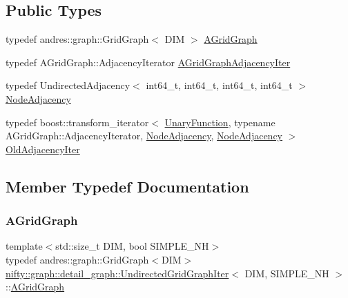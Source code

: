 \subsection*{Public Types}
\begin{DoxyCompactItemize}
\item 
typedef andres\+::graph\+::\+Grid\+Graph$<$ D\+IM $>$ \hyperlink{classnifty_1_1graph_1_1detail__graph_1_1UndirectedGridGraphIter_a562bd40c2ea973c15b828062247ddd1f}{A\+Grid\+Graph}
\item 
typedef A\+Grid\+Graph\+::\+Adjacency\+Iterator \hyperlink{classnifty_1_1graph_1_1detail__graph_1_1UndirectedGridGraphIter_a824924927d819949af2370aa628af595}{A\+Grid\+Graph\+Adjacency\+Iter}
\item 
typedef Undirected\+Adjacency$<$ int64\+\_\+t, int64\+\_\+t, int64\+\_\+t, int64\+\_\+t $>$ \hyperlink{classnifty_1_1graph_1_1detail__graph_1_1UndirectedGridGraphIter_ab102d464df39aae71f7482baa37d8966}{Node\+Adjacency}
\item 
typedef boost\+::transform\+\_\+iterator$<$ \hyperlink{structnifty_1_1graph_1_1detail__graph_1_1UndirectedGridGraphIter_1_1UnaryFunction}{Unary\+Function}, typename A\+Grid\+Graph\+::\+Adjacency\+Iterator, \hyperlink{classnifty_1_1graph_1_1detail__graph_1_1UndirectedGridGraphIter_ab102d464df39aae71f7482baa37d8966}{Node\+Adjacency}, \hyperlink{classnifty_1_1graph_1_1detail__graph_1_1UndirectedGridGraphIter_ab102d464df39aae71f7482baa37d8966}{Node\+Adjacency} $>$ \hyperlink{classnifty_1_1graph_1_1detail__graph_1_1UndirectedGridGraphIter_a0b2569d896d215175b54ed1f439ad5a5}{Old\+Adjacency\+Iter}
\end{DoxyCompactItemize}


\subsection{Member Typedef Documentation}
\mbox{\label{classnifty_1_1graph_1_1detail__graph_1_1UndirectedGridGraphIter_a562bd40c2ea973c15b828062247ddd1f}} 
\subsubsection{\texorpdfstring{A\+Grid\+Graph}{AGridGraph}}
{\footnotesize\ttfamily template$<$std\+::size\+\_\+t D\+IM, bool S\+I\+M\+P\+L\+E\+\_\+\+NH$>$ \\
typedef andres\+::graph\+::\+Grid\+Graph$<$D\+IM$>$ \hyperlink{classnifty_1_1graph_1_1detail__graph_1_1UndirectedGridGraphIter}{nifty\+::graph\+::detail\+\_\+graph\+::\+Undirected\+Grid\+Graph\+Iter}$<$ D\+IM, S\+I\+M\+P\+L\+E\+\_\+\+NH $>$\+::\hyperlink{classnifty_1_1graph_1_1detail__graph_1_1UndirectedGridGraphIter_a562bd40c2ea973c15b828062247ddd1f}{A\+Grid\+Graph}}

